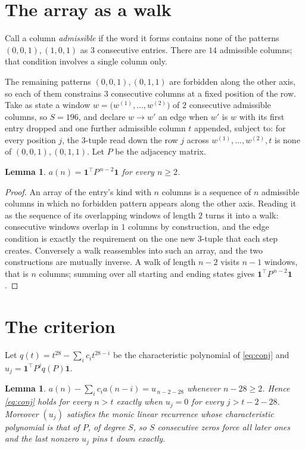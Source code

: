 \documentclass[11pt,a4paper]{article}
\theoremstyle{plain}
\newtheorem{lemma}[theorem]{Lemma}
\theoremstyle{definition}
\begin{document}
\section{The array as a walk}

Call a column \emph{admissible} if the word it forms contains none of the patterns
$(0,0,1), (1,0,1)$ as $3$ consecutive entries. There are $14$ admissible columns; that condition
involves a single column only.

The remaining patterns $(0,0,1), (0,1,1)$ are forbidden along the other axis, so each of them
constrains $3$ consecutive columns at a fixed position of the row. Take as state a
window $w=\bigl(w^{(1)},\dots,w^{(2)}\bigr)$ of $2$ consecutive admissible
columns, so $S=196$, and declare $w\to w'$ an edge when $w'$ is $w$ with its first entry
dropped and one further admissible column $t$ appended, subject to: for every position
$j$, the $3$-tuple read down the row $j$ across $w^{(1)},\dots,w^{(2)},t$
is none of $(0,0,1), (0,1,1)$. Let $P$ be the adjacency matrix.

\begin{lemma}\label{lem:walk}
$a(n)=\mathbf{1}^{\!\top}P^{\,n-2}\mathbf{1}$ for every $n\ge2$.
\end{lemma}

\begin{proof}
An array of the entry's kind with $n$ columns is a sequence of $n$ admissible columns in
which no forbidden pattern appears along the other axis. Reading it as the sequence of its
overlapping windows of length $2$ turns it into a walk: consecutive windows overlap in
$1$ columns by construction, and the edge condition is exactly the requirement on the one
new $3$-tuple that each step creates. Conversely a walk reassembles into such an array,
and the two constructions are mutually inverse. A walk of length $n-2$ visits $n-1$
windows, that is $n$ columns; summing over all starting and ending states gives
$\mathbf{1}^{\!\top}P^{\,n-2}\mathbf{1}$.
\end{proof}

\section{The criterion}

Let $q(t)=t^{28}-\sum_i c_i t^{28-i}$ be the characteristic polynomial of
\eqref{eq:conj} and $u_j=\mathbf{1}^{\!\top}P^{j}q(P)\mathbf{1}$.

\begin{lemma}\label{lem:crit}
$a(n)-\sum_i c_i a(n-i)=u_{\,n-2-28}$ whenever $n-28\ge2$. Hence
\eqref{eq:conj} holds for every $n>t$ exactly when $u_j=0$ for every
$j>t-2-28$. Moreover $(u_j)$ satisfies the monic linear recurrence whose
characteristic polynomial is that of $P$, of degree $S$, so $S$ consecutive zeros force all
later ones and the last nonzero $u_j$ pins $t$ down exactly.
\end{lemma}
\end{document}
